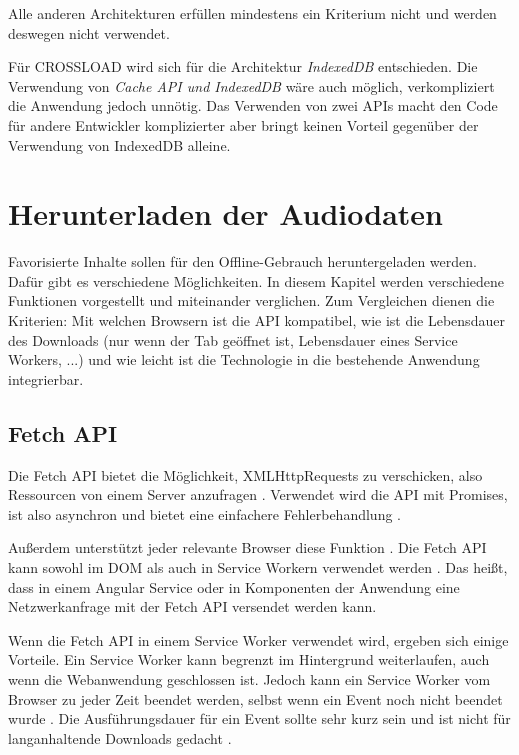 Alle anderen Architekturen erfüllen mindestens ein Kriterium nicht und werden deswegen nicht verwendet.

Für CROSSLOAD wird sich für die Architektur \textit{IndexedDB} entschieden. Die Verwendung von \textit{Cache API und IndexedDB} wäre auch möglich, verkompliziert die Anwendung jedoch unnötig. Das Verwenden von zwei \acp{API} macht den Code für andere Entwickler komplizierter aber bringt keinen Vorteil gegenüber der Verwendung von IndexedDB alleine.

\section{Herunterladen der Audiodaten}
Favorisierte Inhalte sollen für den Offline-Gebrauch heruntergeladen werden. Dafür gibt es verschiedene Möglichkeiten. In diesem Kapitel werden verschiedene Funktionen vorgestellt und miteinander verglichen. Zum Vergleichen dienen die Kriterien: Mit welchen Browsern ist die \ac{API} kompatibel, wie ist die Lebensdauer des Downloads (nur wenn der Tab geöffnet ist, Lebensdauer eines Service Workers, ...) und wie leicht ist die Technologie in die bestehende Anwendung integrierbar.

\subsection{Fetch API}
Die Fetch \ac{API} bietet die Möglichkeit, XMLHttpRequests zu verschicken, also Ressourcen von einem Server anzufragen \autocite{Rojas2020}. Verwendet wird die \ac{API} mit Promises, ist also asynchron und bietet eine einfachere Fehlerbehandlung \autocite{Rojas2020} \autocite{mdn-fetch}. 

Außerdem unterstützt jeder relevante Browser diese Funktion \autocite{mdn-fetch}. Die Fetch \ac{API} kann sowohl im \ac{DOM} als auch in Service Workern verwendet werden \autocite{mdn-fetch}. Das heißt, dass in einem Angular Service oder in Komponenten der Anwendung eine Netzwerkanfrage mit der Fetch \ac{API} versendet werden kann.

Wenn die Fetch \ac{API} in einem Service Worker verwendet wird, ergeben sich einige Vorteile. Ein Service Worker kann begrenzt im Hintergrund weiterlaufen, auch wenn die Webanwendung geschlossen ist. Jedoch kann ein Service Worker vom Browser zu jeder Zeit beendet werden, selbst wenn ein Event noch nicht beendet wurde \autocite{service-worker-spec}. Die Ausführungsdauer für ein Event sollte sehr kurz sein und ist nicht für langanhaltende Downloads gedacht \autocite{service-worker-spec}.

